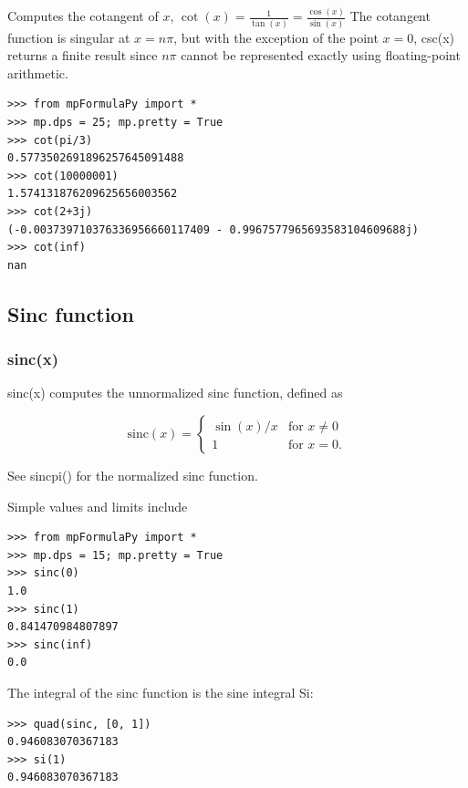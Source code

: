 Computes the cotangent of $x$, $\cot(x)=\frac{1}{\tan(x)}=\frac{\cos(x)}{\sin(x)}$ The cotangent function is singular at $x=n \pi$, but with the exception of the point $x=0$, csc(x) returns a finite result since $n \pi$ cannot be represented exactly using floating-point arithmetic.

\begin{lstlisting}
>>> from mpFormulaPy import *
>>> mp.dps = 25; mp.pretty = True
>>> cot(pi/3)
0.5773502691896257645091488
>>> cot(10000001)
1.574131876209625656003562
>>> cot(2+3j)
(-0.003739710376336956660117409 - 0.9967577965693583104609688j)
>>> cot(inf)
nan
\end{lstlisting}

\newpage



\subsection{Sinc function}

\subsubsection{sinc(x)}
sinc(x) computes the unnormalized sinc function, defined as

\begin{equation}
	\text{sinc}(x)=\begin{cases}
		\sin(x)/x & \text{for }x \ne 0\\
		1 & \text{for }x=0.
	\end{cases}
\end{equation}


See sincpi() for the normalized sinc function.

Simple values and limits include

\begin{lstlisting}
>>> from mpFormulaPy import *
>>> mp.dps = 15; mp.pretty = True
>>> sinc(0)
1.0
>>> sinc(1)
0.841470984807897
>>> sinc(inf)
0.0
\end{lstlisting}

The integral of the sinc function is the sine integral Si:

\begin{lstlisting}
>>> quad(sinc, [0, 1])
0.946083070367183
>>> si(1)
0.946083070367183
\end{lstlisting}



